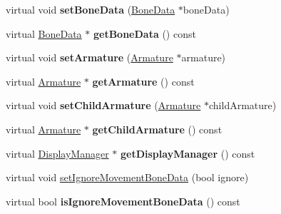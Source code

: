 \begin{DoxyCompactItemize}
\item 
\mbox{\label{classcocostudio_1_1Bone_aded70025d77725dcfe1fe1493c13c54c}} 
virtual void {\bfseries set\+Bone\+Data} (\hyperlink{classcocostudio_1_1BoneData}{Bone\+Data} $\ast$bone\+Data)
\item 
\mbox{\label{classcocostudio_1_1Bone_ad1270c5e1cd559b4670c0cf297c6619f}} 
virtual \hyperlink{classcocostudio_1_1BoneData}{Bone\+Data} $\ast$ {\bfseries get\+Bone\+Data} () const
\item 
\mbox{\label{classcocostudio_1_1Bone_a67826048865f2bd601739400fb7b75e5}} 
virtual void {\bfseries set\+Armature} (\hyperlink{classcocostudio_1_1Armature}{Armature} $\ast$armature)
\item 
\mbox{\label{classcocostudio_1_1Bone_adfea5b6e846b21ad84bc3d29402d2960}} 
virtual \hyperlink{classcocostudio_1_1Armature}{Armature} $\ast$ {\bfseries get\+Armature} () const
\item 
\mbox{\label{classcocostudio_1_1Bone_a821337e644518860d9a69bd72850caa1}} 
virtual void {\bfseries set\+Child\+Armature} (\hyperlink{classcocostudio_1_1Armature}{Armature} $\ast$child\+Armature)
\item 
\mbox{\label{classcocostudio_1_1Bone_ac86729e535f58d4d012517307a5e37db}} 
virtual \hyperlink{classcocostudio_1_1Armature}{Armature} $\ast$ {\bfseries get\+Child\+Armature} () const
\item 
\mbox{\label{classcocostudio_1_1Bone_a14486779c09b09dbda7fd33759ade76d}} 
virtual \hyperlink{classcocostudio_1_1DisplayManager}{Display\+Manager} $\ast$ {\bfseries get\+Display\+Manager} () const
\item 
virtual void \hyperlink{classcocostudio_1_1Bone_a6c8735332243b0b39df0bc437eb0b733}{set\+Ignore\+Movement\+Bone\+Data} (bool ignore)
\item 
\mbox{\label{classcocostudio_1_1Bone_aced532bc59f76c0c1538e976d350785b}} 
virtual bool {\bfseries is\+Ignore\+Movement\+Bone\+Data} () const
\item 

\end{DoxyCompactItemize}
